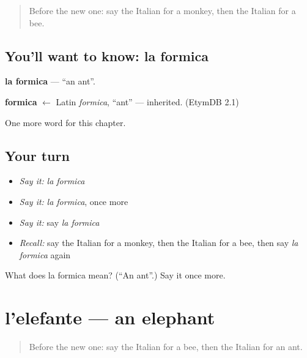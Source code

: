 \label{lesson:IT-C71-formica}



\begin{quote}
Before the new one: say the Italian for a monkey, then the Italian for a bee.
\end{quote}

\subsection*{You'll want to know: la formica}
\textbf{la formica} — \textquotedblleft{}an ant\textquotedblright{}.

\begin{cousinweb}
\textbf{formica} $\leftarrow$ Latin \emph{formica}, \textquotedblleft{}ant\textquotedblright{} — inherited. (EtymDB 2.1)
\end{cousinweb}

\begin{grammarlens}[title={What you've built}]
One more word for this chapter.
\end{grammarlens}

\subsection*{Your turn}
\begin{itemize}
\raggedright
  \item \emph{Say it:} \emph{la formica}
  \item \emph{Say it:} \emph{la formica}, once more
  \item \emph{Say it:} say \emph{la formica}
  \item \emph{Recall:} say the Italian for a monkey, then the Italian for a bee, then say \emph{la formica} again
\end{itemize}

\begin{tcolorbox}[breakable,colback=teal!4,colframe=teal!35!black,title={Before you move on}]
What does la formica mean? (\textquotedblleft{}An ant\textquotedblright{}.) Say it once more.
\end{tcolorbox}
\section[l'elefante]{l'elefante — an elephant}

\label{lesson:IT-C71-elefante}



\begin{quote}
Before the new one: say the Italian for a bee, then the Italian for an ant.
\end{quote}

